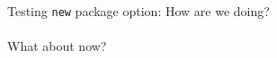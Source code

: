 \documentclass{article}
\begin{document}
Testing \texttt{new} package option: How are we doing?\\
\\
What about now?\\
\end{document}
